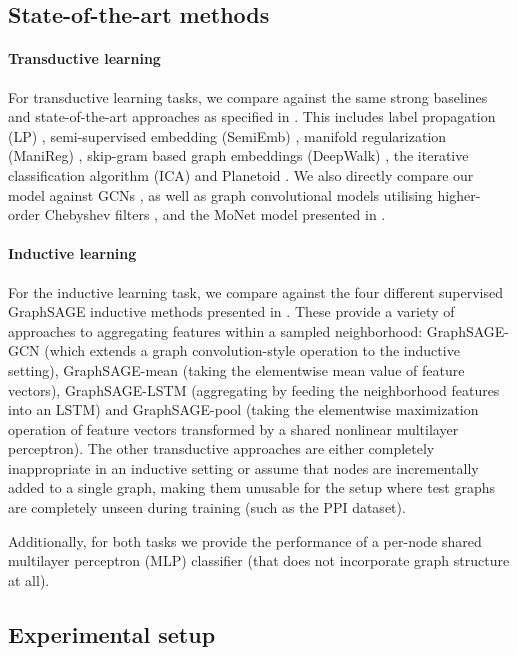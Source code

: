 \documentclass{article} %
\begin{document}
\subsection{State-of-the-art methods}

\paragraph{Transductive learning}
For transductive learning tasks, we compare against the same strong baselines and state-of-the-art approaches as specified in \cite{kipf2016semi}. This includes label propagation (LP) \citep{zhu2003semi}, semi-supervised embedding (SemiEmb) \citep{weston2012deep}, manifold regularization (ManiReg) \citep{belkin2006manifold}, skip-gram based graph embeddings (DeepWalk) \citep{perozzi2014deepwalk}, the iterative classification algorithm (ICA) \citep{lu2003link} and Planetoid \citep{yang2016revisiting}. We also directly compare our model against GCNs \citep{kipf2016semi}, as well as graph convolutional models utilising higher-order Chebyshev filters \citep{defferrard2016convolutional}, and the MoNet model presented in \cite{monti2016geometric}.

\paragraph{Inductive learning}
For the inductive learning task, we compare against the four different supervised GraphSAGE inductive methods presented in \cite{hamilton2017inductive}. These provide a variety of approaches to aggregating features within a sampled neighborhood: GraphSAGE-GCN (which extends a graph convolution-style operation to the inductive setting), GraphSAGE-mean (taking the elementwise mean value of feature vectors), GraphSAGE-LSTM (aggregating by feeding the neighborhood features into an LSTM) and GraphSAGE-pool (taking the elementwise maximization operation of feature vectors transformed by a shared nonlinear multilayer perceptron). The other transductive approaches are either completely inappropriate in an inductive setting or assume that nodes are incrementally added to a single graph, making them unusable for the setup where test graphs are completely unseen during training (such as the PPI dataset).

Additionally, for both tasks we provide the performance of a per-node shared multilayer perceptron (MLP) classifier (that does not incorporate graph structure at all).

\subsection{Experimental setup}
\end{document}
